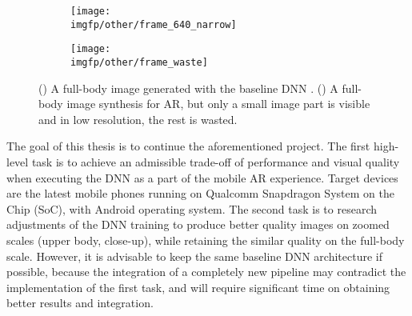 \begin{figure}[h!]
	\fboxrule=2pt
	\centering
	\begin{subfigure}[b]{0.4\textwidth}
		\centering
		\texttt{[image: \\imgfp/other/frame\_640\_narrow]}
		\caption{}
		\label{intro:fig:stylepeople_frame:640}
	\end{subfigure}
	\hfill
	\begin{subfigure}[b]{0.59\textwidth}
		\centering
		\texttt{[image: \\imgfp/other/frame\_waste]}
		\caption{}
		\label{intro:fig:stylepeople_frame:waste}
	\end{subfigure}

	\caption{(\protect{}) A full-body image generated with the baseline DNN \cite{dnn:stylepeople21}. (\protect{}) A full-body image synthesis for AR, but only a small image part is visible and in low resolution, the rest is wasted.}
	\label{intro:fig:stylepeople_frame}
\end{figure}
 
The goal of this thesis is to continue the aforementioned project. The first high-level task is to achieve an admissible trade-off of performance and visual quality when executing the DNN as a part of the mobile AR experience. Target devices are the latest mobile phones running on Qualcomm Snapdragon System on the Chip (SoC), with Android operating system. The second task is to research adjustments of the DNN training to produce better quality images on zoomed scales (upper body, close-up), while retaining the similar quality on the full-body scale. However, it is advisable to keep the same baseline \cite{dnn:stylepeople21} DNN architecture if possible, because the integration of a completely new pipeline may contradict the implementation of the first task, and will require significant time on obtaining better results and integration.
 
